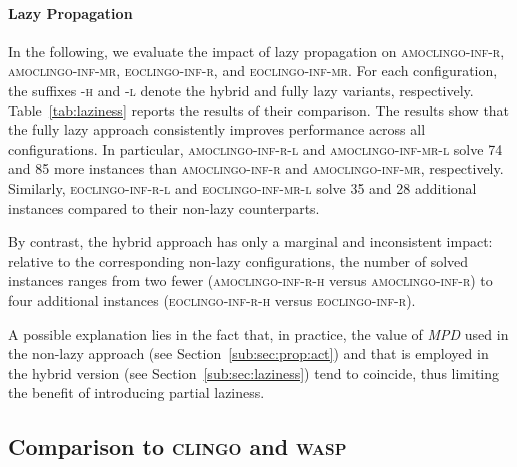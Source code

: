 \documentclass[preprint,authoryear]{elsarticle}
\newcommand{\wasp}{\textsc{wasp}\xspace}
\newcommand{\clingo}{\textsc{clingo}\xspace}
\newcommand{\amowaspij}{\textsc{amowasp-base-py}\xspace}
\newcommand{\amoclingoinfr}{\textsc{amoclingo-inf-r}\xspace}
\newcommand{\amoclingoinfrhybrid}{\textsc{amoclingo-inf-r-h}\xspace}
\newcommand{\amoclingoinfrlazy}{\textsc{amoclingo-inf-r-l}\xspace}
\newcommand{\amoclingoinfmr}{\textsc{amoclingo-inf-mr}\xspace}
\newcommand{\amoclingoinfmrlazy}{\textsc{amoclingo-inf-mr-l}\xspace}
\newcommand{\eoclingoinfr}{\textsc{eoclingo-inf-r}\xspace}
\newcommand{\eoclingoinfrlazy}{\textsc{eoclingo-inf-r-l}\xspace}
\newcommand{\eoclingoinfrhybrid}{\textsc{eoclingo-inf-r-h}\xspace}
\newcommand{\eoclingoinfmr}{\textsc{eoclingo-inf-mr}\xspace}
\newcommand{\eoclingoinfmrlazy}{\textsc{eoclingo-inf-mr-l}\xspace}
\theoremstyle{definition}
\begin{document}
\paragraph{Lazy Propagation}
{\color{blue}
In the following, we evaluate the impact of lazy propagation on \amoclingoinfr, \amoclingoinfmr, \eoclingoinfr, and \eoclingoinfmr. For each configuration, the suffixes \textsc{-h} and \textsc{-l} denote the hybrid and fully lazy variants, respectively. 
Table~\ref{tab:laziness} reports the results of their comparison.
%
The results show that the fully lazy approach consistently improves performance across all configurations. In particular, \amoclingoinfrlazy and \amoclingoinfmrlazy solve 74 and 85 more instances than \amoclingoinfr and \amoclingoinfmr, respectively. Similarly, \eoclingoinfrlazy and \eoclingoinfmrlazy solve 35 and 28 additional instances compared to their non-lazy counterparts.

By contrast, the hybrid approach has only a marginal and inconsistent impact: relative to the corresponding non-lazy configurations, the number of solved instances ranges from two fewer (\amoclingoinfrhybrid versus \amoclingoinfr) to four additional instances (\eoclingoinfrhybrid versus \eoclingoinfr).
}

A possible explanation lies in the fact that, in practice, the value of \textit{MPD} used in the non-lazy approach (see Section~\ref{sub:sec:prop:act}) and that is employed in the hybrid version (see Section~\ref{sub:sec:laziness}) tend to coincide, thus limiting the benefit of introducing partial laziness.

\subsection{Comparison to \textsc{clingo} and \textsc{wasp}}

\end{document}
